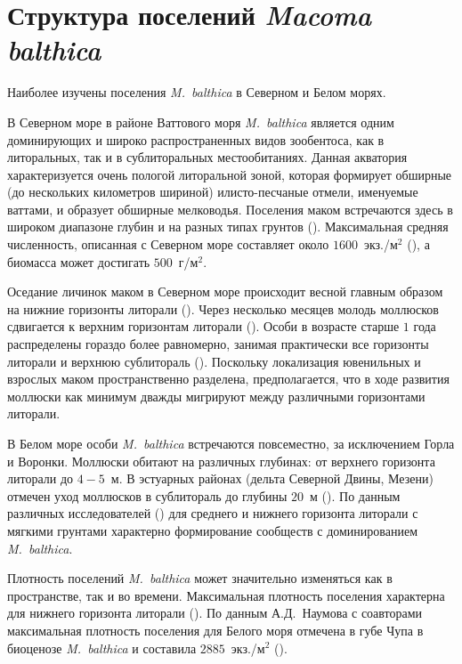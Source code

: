 		\section{Структура поселений {\it Macoma balthica}}

Наиболее изучены поселения \textit{M.~balthica} в Северном и Белом морях.

В Северном море в районе Ваттового моря \textit{M.~balthica} является одним доминирующих и широко распространенных видов зообентоса, как в литоральных, так и в сублиторальных местообитаниях.
Данная акватория характеризуется очень пологой литоральной зоной, которая формирует обширные (до нескольких километров шириной) илисто-песчаные отмели, именуемые ваттами, и образует обширные мелководья. 
Поселения маком встречаются здесь в широком диапазоне глубин и на разных типах грунтов (\cite{Beukema_et_al_1993, Hiddink_et_al_2002_predation_infauna, Hiddink_et_al_2002_predation_epifauna, Hiddink_2003}).
Максимальная средняя численность, описанная с Северном море составляет около $1600$~экз./м$^2$ (\cite{Reading_1979}), а биомасса может достигать $500$~г/м$^2$.

Оседание личинок маком в Северном море происходит весной главным образом на нижние горизонты литорали (\cite{Strasser_Gunter_2001}). 
Через несколько месяцев молодь моллюсков сдвигается к верхним горизонтам литорали (\cite{Armonies_Hellwig-Armonies_1992}). 
Особи в возрасте старше $1$ года распределены гораздо более равномерно, занимая практически все горизонты литорали и верхнюю сублитораль (\cite{Beukema_et_al_1993}). Поскольку локализация ювенильных и взрослых маком пространственно разделена, предполагается, что в ходе развития моллюски как минимум дважды мигрируют между различными горизонтами литорали. 


В Белом море особи \textit{M.~balthica} встречаются  повсеместно, за исключением Горла и Воронки. 
Моллюски обитают на различных глубинах: от верхнего горизонта литорали до  $4-5$~м. 
В эстуарных районах (дельта Северной Двины, Мезени) отмечен уход моллюсков в сублитораль до глубины $20$~м (\cite{Semenova_1974, Naumov_2006}).
По данным различных исследователей (\cite{Babkov_Golikov_1984, Naumov_2006}) для среднего и нижнего горизонта литорали с мягкими грунтами характерно формирование сообществ с доминированием \textit{M.~balthica}. 

Плотность поселений \textit{M.~balthica} может значительно изменяться как в пространстве, так и во времени. 
Максимальная плотность поселения характерна для нижнего горизонта литорали (\cite{Semenova_1974, Maximovich_et_al_1991}). 
По данным А.\:Д.~Наумова с соавторами максимальная плотность поселения для Белого моря отмечена в губе Чупа в биоценозе \textit{M.~balthica} и составила $2885$~экз./м$^2$ (\cite{Naumov_2006}).

